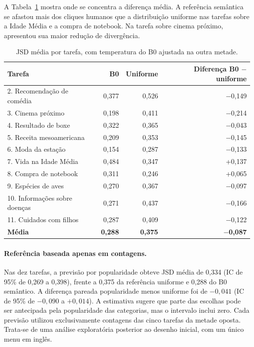 \documentclass[12pt]{article}
\begin{document}
A Tabela~\ref{tab:por-tarefa} mostra onde se concentra a diferença média. A referência semântica se afastou mais dos cliques humanos que a distribuição uniforme nas tarefas sobre a Idade Média e a compra de notebook. Na tarefa sobre cinema próximo, apresentou sua maior redução de divergência.

\begin{table}[!htb]\centering\small\caption{JSD média por tarefa, com temperatura do B0 ajustada na outra metade.}\label{tab:por-tarefa}\begin{tabularx}{\linewidth}{@{}Xrrr@{}}\toprule
Tarefa & B0 & Uniforme & Diferença B0 $-$ uniforme \\ \midrule
2. Recomendação de comédia & 0,377 & 0,526 & $-$0,149 \\
3. Cinema próximo & 0,198 & 0,411 & $-$0,214 \\
4. Resultado de boxe & 0,322 & 0,365 & $-$0,043 \\
5. Receita mesoamericana & 0,209 & 0,353 & $-$0,145 \\
6. Moda da estação & 0,154 & 0,287 & $-$0,133 \\
7. Vida na Idade Média & 0,484 & 0,347 & +0,137 \\
8. Compra de notebook & 0,311 & 0,246 & +0,065 \\
9. Espécies de aves & 0,270 & 0,367 & $-$0,097 \\
10. Informações sobre doenças & 0,271 & 0,437 & $-$0,166 \\
11. Cuidados com filhos & 0,287 & 0,409 & $-$0,122 \\
\textbf{Média} & \textbf{0,288} & \textbf{0,375} & \textbf{$-$0,087} \\\bottomrule\end{tabularx}\end{table}

\paragraph{Referência baseada apenas em contagens.} Nas dez tarefas, a previsão por popularidade obteve JSD média de 0,334 (IC de 95\% de 0,269 a 0,398), frente a 0,375 da referência uniforme e 0,288 do B0 semântico. A diferença pareada popularidade menos uniforme foi de $-0{,}041$ (IC de 95\% de $-0{,}090$ a $+0{,}014$). A estimativa sugere que parte das escolhas pode ser antecipada pela popularidade das categorias, mas o intervalo inclui zero. Cada previsão utilizou exclusivamente contagens das cinco tarefas da metade oposta. Trata-se de uma análise exploratória posterior ao desenho inicial, com um único menu em inglês.
\end{document}
